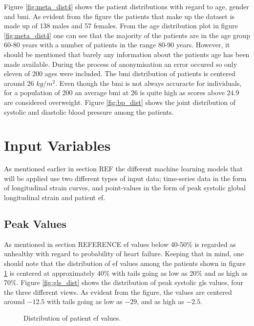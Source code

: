 Figure \ref{fig:meta_dist4} shows the patient distributions with regard to age, gender and \acrshort{bmi}. As evident from the figure the patients that make up the dataset is made up of 138 males and 57 females. From the age distribution plot in figure \ref{fig:meta_dist4} one can see that the majority of the patients are in the age group 60-80 years with a number of patients in the range 80-90 years. However, it should be mentioned that barely any information about the patients age has been made available. During the process of anonymisation an error occured so only eleven of 200 ages were included. The \acrshort{bmi} distribution of patients is centered around 26 $kg/m^2$. Even though the \acrshort{bmi} is not always accuracte for individuals, for a population of 200 an average \acrshort{bmi} at 26 is quite high as scores above 24.9 are considered overweight. Figure \ref{fig:bp_dist} shows the joint distribution of systolic and diastolic blood pressure among the patients. \bigskip

\section{Input Variables} \label{sec:covariates}
As mentioned earlier in section REF the different machine learning models that will be applied use two different types of input data; time-series data in the form of longitudinal strain curves, and point-values in the form of peak systolic global longitudinal strain and patient \acrshort{ef}. \bigskip

\subsection{Peak Values}
As mentioned in section REFERENCE \acrshort{ef} values below 40-50$\%$ is regarded as unhealthy with regard to probability of heart failure. Keeping that in mind, one should note that the distribution of \acrshort{ef} values among the patients shown in figure \ref{fig:EF_dist} is centered at approximately 40$\%$ with tails going as low as 20$\%$ and as high as 70$\%$. Figure \ref{fig:gls_dist} shows the distribution of peak systolic \acrshort{gls} values, four the three different views. As evident from the figure, the values are centered around $-12.5$ with tails going as low as $-29$, and as high as $-2.5$. \bigskip

\begin{figure}[h]
    \centering
    
    \caption{Distribution of patient \acrshort{ef} values.}
    \label{fig:EF_dist}
\end{figure}

